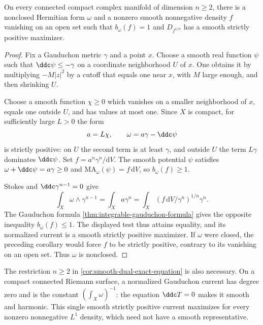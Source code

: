 \begin{example}\label{ex:nonclosed-dual-zero-density}
On every connected compact complex manifold of dimension $n\geq2$, there is a nonclosed Hermitian form $\omega$ and a nonzero smooth nonnegative density $f$ vanishing on an open set such that $b_\omega(f)=1$ and $D_{f^{1/n}}$ has a smooth strictly positive maximizer.
\end{example}
\begin{proof}
Fix a Gauduchon metric $\gamma$ and a point $x$. Choose a smooth real function $\psi$ such that $\ddc\psi\leq-\gamma$ on a coordinate neighborhood $U$ of $x$. One obtains it by multiplying $-M|z|^2$ by a cutoff that equals one near $x$, with $M$ large enough, and then shrinking $U$.

Choose a smooth function $\chi\geq0$ which vanishes on a smaller neighborhood of $x$, equals one outside $U$, and has values at most one. Since $X$ is compact, for sufficiently large $L>0$ the form
\[
 a=L\chi,\qquad \omega=a\gamma-\ddc\psi
\]
is strictly positive: on $U$ the second term is at least $\gamma$, and outside $U$ the term $L\gamma$ dominates $\ddc\psi$. Set $f=a^n\gamma^n/\mathrm{d}V$. The smooth potential $\psi$ satisfies $\omega+\ddc\psi=a\gamma\geq0$ and $\mathrm{MA}_\omega(\psi)=f\,\mathrm{d}V$, so $b_\omega(f)\geq1$.

Stokes and $\ddc\gamma^{n-1}=0$ give
\[
 \int_X\omega\wedge\gamma^{n-1}
 =\int_Xa\gamma^n
 =\int_X(f\,\mathrm{d}V/\gamma^n)^{1/n}\gamma^n.
\]
The Gauduchon formula \cref{thm:integrable-gauduchon-formula} gives the opposite inequality $b_\omega(f)\leq1$. The displayed test thus attains equality, and its normalized current is a smooth strictly positive maximizer. If $\omega$ were closed, the preceding corollary would force $f$ to be strictly positive, contrary to its vanishing on an open set. Thus $\omega$ is nonclosed.
\end{proof}

The restriction $n\geq2$ in \cref{cor:smooth-dual-exact-equation} is also necessary. On a compact connected Riemann surface, a normalized Gauduchon current has degree zero and is the constant $(\int_X\omega)^{-1}$: the equation $\ddc T=0$ makes it smooth and harmonic. This single smooth strictly positive current maximizes for every nonzero nonnegative $L^1$ density, which need not have a smooth representative.
